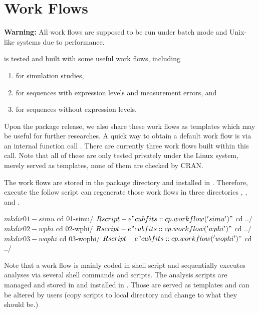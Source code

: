 
\section[Work Flows]{Work Flows}
\label{sec:work_flows}

{\color{red} \bf Warning:}
All work flows are supposed to be run under batch mode and Unix-like systems
due to performance.

 is tested and built with some useful work flows,
including
\begin{enumerate}
\item {} for simulation studies,
\item {} for sequences with expression levels and measurement errors,
      and
\item {} for sequences without expression levels.
\end{enumerate}
Upon the  package release,
we also share these work flows as templates which may be useful for further
researches. A quick way to obtain a default work flow is via an internal
function call . There are currently three work
flows built within this call.
Note that all of these are only tested privately under the Linux system,
merely served as templates, none of them are checked by CRAN.

The work flows are stored in the package directory
 and installed in
. Therefore, execute the
follow script can regenerate those work flows in three directories
, , and .
\begin{Command}
$ mkdir 01-simu
$ cd 01-simu/
$ Rscript -e "cubfits::cp.workflow('simu')"
$ cd ../
$ mkdir 02-wphi
$ cd 02-wphi/
$ Rscript -e "cubfits::cp.workflow('wphi')"
$ cd ../
$ mkdir 03-wophi
$ cd 03-wophi/
$ Rscript -e "cubfits::cp.workflow('wophi')"
$ cd ../
\end{Command}
Note that a work flow is mainly coded in shell script and sequentially
executes analyses via several shell commands and  scripts. The
analysis  scripts are managed and stored in
 and installed in
. Those are served as
templates and can be altered by users (copy scripts to local directory
and change to what they should be.)

